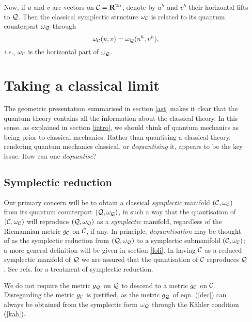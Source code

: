 \documentclass[a4paper,a4paper]{article}
\begin{document}
Now, if $u$ and $v$ are vectors on ${\cal C}={\bf R}^{2n}$, denote by $u^h$ and $v^h$ 
their horizontal lifts to ${\cal Q}$. Then the classical symplectic 
structure $\omega_{\cal C}$ is related to its quantum 
counterpart $\omega_{\cal Q}$ through 
\begin{equation}
\omega_{\cal C}(u,v)=\omega_{\cal Q}(u^h, v^h),
\label{lift}
\end{equation}
{\it i.e.}, $\omega_{\cal C}$ is the horizontal part of $\omega_{\cal Q}$. 

\section{Taking a classical limit}\label{claslim}

The geometric presentation summarised in section \ref{ast} makes it clear 
that the quantum theory contains all the information about the classical theory. 
In this sense, as explained in section \ref{intro}, we should think of 
quantum mechanics as being prior to classical mechanics. Rather than 
quantising a classical theory, rendering quantum mechanics classical, 
or {\it dequantising}\/ it, appears to be the key issue. How can one 
{\it dequantise}\/? 

\subsection{Symplectic reduction}\label{rol}

Our primary concern will be to obtain a classical {\it symplectic} manifold 
$({\cal C},\omega_{\cal C})$ from its quantum counterpart $({\cal Q}, \omega_{\cal Q})$, 
in such a way that the quantisation of $({\cal C},\omega_{\cal C})$ will reproduce $({\cal Q}, 
\omega_{\cal Q})$ as a {\it symplectic} manifold,  regardless of the Riemannian metric 
$g_{\cal C}$ on ${\cal C}$, if any. In principle, {\it dequantisation} may be thought of 
as the symplectic reduction from $({\cal Q}, \omega_{\cal Q})$ to a symplectic submanifold 
$({\cal C},\omega_{\cal C})$; a more general definition will be given in 
section \ref{foli}. In having ${\cal C}$ as a reduced symplectic 
manifold of ${\cal Q}$ we are assured that the quantisation of ${\cal C}$ 
reproduces ${\cal Q}$. See refs. \cite{RATIU, WEINSTEIN} 
for a treatment of symplectic reduction.

We do not require the metric $g_{\cal Q}$ on ${\cal Q}$ to descend to a metric $g_{\cal C}$ 
on ${\cal C}$. Disregarding the metric $g_{\cal C}$ is justified, as the metric $g_{\cal Q}$ 
of eqn. (\ref{dec}) can always be obtained from the symplectic form $\omega_{\cal Q}$ 
through the K\"ahler condition (\ref{kah}).
 
\end{document}
